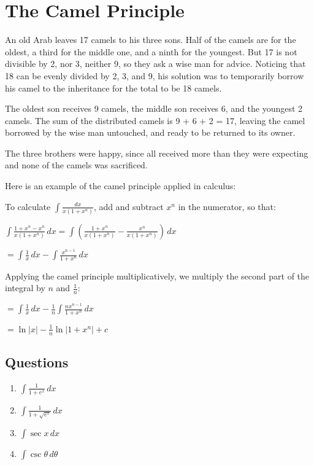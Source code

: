 \documentclass[../main.tex]{subfiles}
\begin{document}
\section{The Camel Principle}
An old Arab leaves 17 camels to his three sons. Half of the camels are for the oldest, a third for the middle one, and a ninth for the youngest. But 17 is not divisible by 2, nor 3, neither 9, so they ask a wise man for advice. Noticing that 18 can be evenly divided by 2, 3, and 9, his solution was to temporarily borrow his camel to the inheritance for the total to be 18 camels.

The oldest son receives 9 camels, the middle son receives 6, and the youngest 2 camels. The sum of the distributed camels is 9 + 6 + 2 = 17, leaving the camel borrowed by the wise man untouched, and ready to be returned to its owner.

The three brothers were happy, since all received more than they were expecting and none of the camels was sacrificed.

Here is an example of the camel principle applied in calculus:

To calculate \(\int \frac{dx}{x(1+x^n)}\), add and subtract \(x^n\) in the numerator, so that:

\(\int \frac{1+x^n-x^n}{x(1+x^n)}\,dx=\int (\frac{1+x^n}{x(1+x^n)}-\frac{x^n}{x(1+x^n)})\,dx\)

\(=\int \frac{1}{x}\,dx-\int \frac{x^{n-1}}{1+x^n}\,dx\)

Applying the camel principle multiplicatively, we multiply the second part of the integral by \(n\) and \(\frac{1}{n}\):

\(=\int \frac{1}{x}\,dx-\frac{1}{n}\int \frac{nx^{n-1}}{1+x^n}\,dx\)

\(=\ln{|x|}-\frac{1}{n}\ln{|1+x^n|}+c\)

\pagebreak

\subsection*{Questions}
\label{Camel Principle}

\begin{enumerate}
    \item \(\int \frac{1}{1+e^x}\,dx\)
    
    \item \(\int \frac{1}{1+\sqrt{e^x}}\,dx\)
    
    \item \(\int \sec{x}\,dx\)
    
    \item \(\int \csc{\theta}\,d\theta\)

\end{enumerate}
\end{document}
